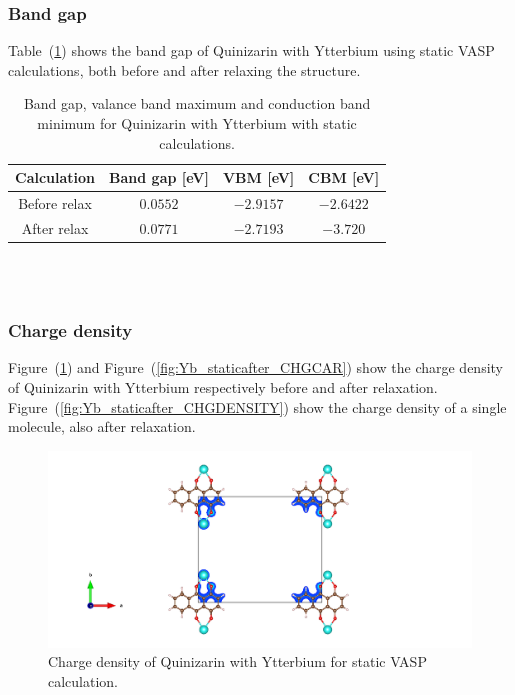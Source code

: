 \documentclass{article}
\begin{document}
      \vspace{1cm}

    \subsubsection{Band gap}

      Table~(\ref{tab:bandgapYb}) shows the band gap of Quinizarin with Ytterbium using static VASP calculations, both before and after relaxing the structure. \\

      \begin{table}[H]
        \centering
        \caption{Band gap, valance band maximum and conduction band minimum for Quinizarin with Ytterbium with static calculations. }
        \vspace{0mm}
        \label{tab:bandgapYb}
        \begin{tabular}{|c|c|c|c|}
            \hline
            Calculation & Band gap [eV] & VBM [eV] & CBM [eV]  \\
            \hline \hline
            Before relax & $0.0552$ & $-2.9157$ & $-2.6422$ \\
            After relax & $0.0771$ & $-2.7193$ & $-3.720$ \\
            \hline
        \end{tabular} \\
        \hspace{0pt}\\
      \end{table}

      \vspace{1cm}

    \subsubsection{Charge density}

      Figure~(\ref{fig:Yb_staticbefore_CHGCAR}) and Figure~(\ref{fig:Yb_staticafter_CHGCAR}) show the charge density of Quinizarin with Ytterbium respectively before and after relaxation. Figure~(\ref{fig:Yb_staticafter_CHGDENSITY}) show the charge density of a single molecule, also after relaxation. \\

      \begin{figure}[H]
          \centering
          \includegraphics[width = \textwidth]{../fig/Yb_staticbefore_CHGCAR.png}
          \caption{Charge density of Quinizarin with Ytterbium for static VASP calculation. }
          \label{fig:Yb_staticbefore_CHGCAR}
      \end{figure}
\end{document}
